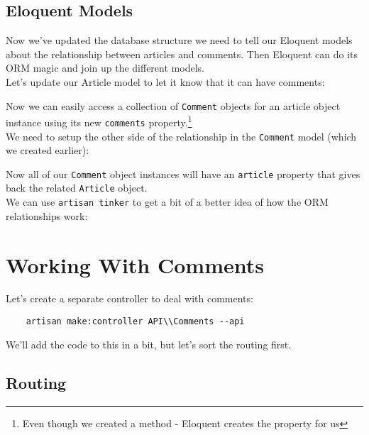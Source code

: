 \subsection{Eloquent Models}

Now we've updated the database structure we need to tell our Eloquent models about the relationship between articles and comments. Then Eloquent can do its ORM magic and join up the different models.
\\

Let's update our Article model to let it know that it can have comments:


Now we can easily access a collection of \texttt{Comment} objects for an article object instance using its new \texttt{comments} property.\footnote{Even though we created a method - Eloquent creates the property for us}
\\

We need to setup the other side of the relationship in the \texttt{Comment} model (which we created earlier):


Now all of our \texttt{Comment} object instances will have an \texttt{article} property that gives back the related \texttt{Article} object.
\\

We can use \texttt{artisan tinker} to get a bit of a better idea of how the ORM relationships work:



\section{Working With Comments}

Let's create a separate controller to deal with comments:

\begin{verbatim}
    artisan make:controller API\\Comments --api
\end{verbatim}

We'll add the code to this in a bit, but let's sort the routing first.


\subsection{Routing}

